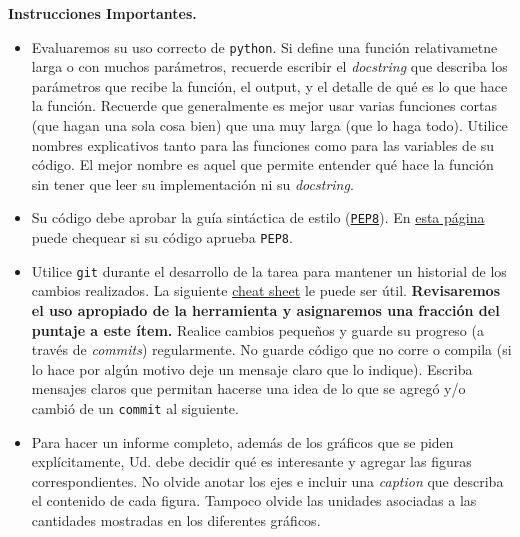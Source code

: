\documentclass[letter, 11pt]{article}
\begin{document}

\vspace{1em}
\noindent\textbf{Instrucciones Importantes.}
\begin{itemize}

\item Evaluaremos su uso correcto de \texttt{python}. Si define una función
  relativametne larga o con muchos parámetros, recuerde escribir el
  \emph{docstring} que describa los parámetros que recibe la función, el
  output, y el detalle de qué es lo que hace la función. Recuerde que
  generalmente es mejor usar varias funciones cortas (que hagan una sola cosa
  bien) que una muy larga (que lo haga todo).  Utilice nombres explicativos
  tanto para las funciones como para las variables de su código. El mejor
  nombre es aquel que permite entender qué hace la función sin tener que leer
  su implementación ni su \emph{docstring}.

\item Su código debe aprobar la guía sintáctica de estilo
  (\href{https://www.python.org/dev/peps/pep-0008/}{\texttt{PEP8}}). En
  \href{http://pep8online.com}{esta página} puede chequear si su código aprueba
  \texttt{PEP8}.

\item Utilice \texttt{git} durante el desarrollo de la tarea para mantener un
  historial de los cambios realizados. La siguiente
  \href{https://education.github.com/git-cheat-sheet-education.pdf}{cheat
    sheet} le puede ser útil. {\bf Revisaremos el uso apropiado de la
  herramienta y asignaremos una fracción del puntaje a este ítem.} Realice
  cambios pequeños y guarde su progreso (a través de \emph{commits})
  regularmente. No guarde código que no corre o compila (si lo hace por algún
  motivo deje un mensaje claro que lo indique). Escriba mensajes claros que
  permitan hacerse una idea de lo que se agregó y/o cambió de un
  \texttt{commit} al siguiente.

\item Para hacer un informe completo, además de los gráficos que se piden
  explícitamente, Ud. debe decidir qué es interesante y agregar las figuras
  correspondientes. No olvide anotar los ejes e incluir una \emph{caption} que
  describa el contenido de cada figura. Tampoco olvide las unidades asociadas a
  las cantidades mostradas en los diferentes gráficos.


\end{itemize}
\end{document}
